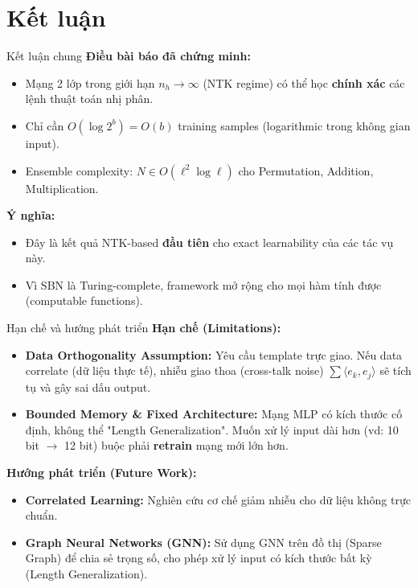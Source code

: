 \section{Kết luận}

\begin{frame}{Kết luận chung}
  \textbf{Điều bài báo đã chứng minh:}
  \begin{itemize}
    \item Mạng 2 lớp trong giới hạn $n_h \to \infty$ (NTK regime) có thể học \textbf{chính xác} các lệnh thuật toán nhị phân.
    \item Chỉ cần $O(\log 2^b) = O(b)$ training samples (logarithmic trong không gian input).
    \item Ensemble complexity: $N \in O(\ell^2 \log \ell)$ cho Permutation, Addition, Multiplication.
  \end{itemize}

  \vspace{0.3cm}
  \textbf{Ý nghĩa:}
  \begin{itemize}
    \item Đây là kết quả NTK-based \textbf{đầu tiên} cho exact learnability của các tác vụ này.
    \item Vì SBN là Turing-complete, framework mở rộng cho mọi hàm tính được (computable functions).
  \end{itemize}
\end{frame}

\begin{frame}{Hạn chế và hướng phát triển}
  \textbf{Hạn chế (Limitations):}
  \begin{itemize}
    \item \textbf{Data Orthogonality Assumption:}
      Yêu cầu template trực giao. Nếu data correlate (dữ liệu thực tế), nhiễu giao thoa (cross-talk noise) $\sum \langle e_k, e_j \rangle$ sẽ tích tụ và gây sai dấu output.
    \item \textbf{Bounded Memory \& Fixed Architecture:}
      Mạng MLP có kích thước cố định, không thể "Length Generalization". Muốn xử lý input dài hơn (vd: 10 bit $\to$ 12 bit) buộc phải \textbf{retrain} mạng mới lớn hơn.
  \end{itemize}

  \vspace{0.3cm}
  \textbf{Hướng phát triển (Future Work):}
  \begin{itemize}
    \item \textbf{Correlated Learning:} Nghiên cứu cơ chế giảm nhiễu cho dữ liệu không trực chuẩn.
    \item \textbf{Graph Neural Networks (GNN):} Sử dụng GNN trên đồ thị (Sparse Graph) để chia sẻ trọng số, cho phép xử lý input có kích thước bất kỳ (Length Generalization).
  \end{itemize}
\end{frame}
